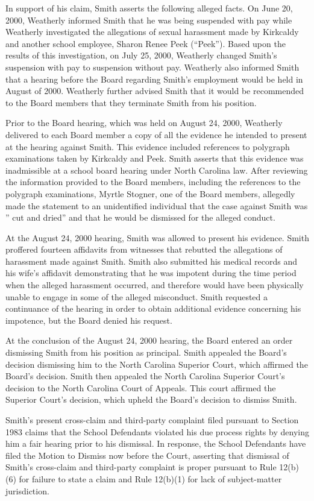 \documentclass[11pt,letterpaper,twoside]{article}
\begin{document}
In support of his claim, Smith asserts the following alleged facts. On
June 20, 2000, Weatherly informed Smith that he was being suspended with
pay while Weatherly investigated the allegations of sexual harassment
made by Kirkcaldy and another school employee, Sharon Renee Peek
(``Peek''). Based upon the results of this investigation, on July 25,
2000, Weatherly changed Smith's suspension with pay to suspension
without pay. Weatherly also informed Smith that a hearing before the
Board regarding Smith's employment would be held in August of 2000.
Weatherly further advised Smith that it would be recommended to the
Board members that they terminate Smith from his position.

Prior to the Board hearing, which was held on August 24, 2000, Weatherly
delivered to each Board member a copy of all the evidence he intended to
present at the hearing against Smith. This evidence included references
to polygraph examinations taken by Kirkcaldy and Peek. Smith asserts
that this evidence was inadmissible at a school board hearing under
North Carolina law. After reviewing the information provided to the
Board members, including the references to the polygraph examinations,
Myrtle Stogner, one of the Board members, allegedly made the statement
to an unidentified individual that the case against Smith was '' cut and
dried'' and that he would be dismissed for the alleged conduct.

At the August 24, 2000 hearing, Smith was allowed to present his
evidence. Smith proffered fourteen affidavits from witnesses that
rebutted the allegations of harassment made against Smith. Smith also
submitted his medical records and his wife's affidavit demonstrating
that he was impotent during the time period when the alleged harassment
occurred, and therefore would have been physically unable to engage in
some of the alleged misconduct. Smith requested a continuance of the
hearing in order to obtain additional evidence concerning his impotence,
but the Board denied his request.

At the conclusion of the August 24, 2000 hearing, the Board entered an
order dismissing Smith from his position as principal. Smith appealed
the Board's decision dismissing him to the North Carolina Superior
Court, which affirmed the Board's decision. Smith then appealed the
North Carolina Superior Court's decision to the North Carolina Court of
Appeals. This court affirmed the Superior Court's decision, which upheld
the Board's decision to dismiss Smith.

Smith's present cross-claim and third-party complaint filed pursuant to
Section 1983 claims that the School Defendants violated his due process
rights by denying him a fair hearing prior to his dismissal. In
response, the School Defendants have filed the Motion to Dismiss now
before the Court, asserting that dismissal of Smith's cross-claim and
third-party complaint is proper pursuant to Rule 12(b)(6) for failure to
state a claim and Rule 12(b)(1) for lack of subject-matter jurisdiction.
\end{document}
